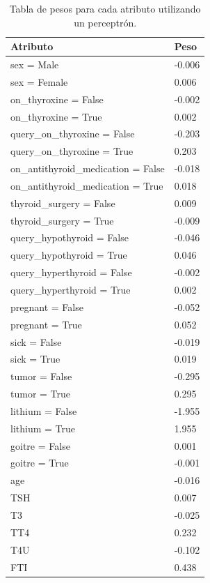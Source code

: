 \documentclass[osajnl,twocolumn,showpacs,superscriptaddress,10pt,floatfix]{revtex4-1} %
\begin{document}
\begin{table}[ht]
    \begin{tabular}{l|l}
        Atributo & Peso \\
        \hline
        sex = Male & -0.006 \\
        sex = Female & 0.006 \\
        on\_thyroxine = False & -0.002 \\
        on\_thyroxine = True & 0.002 \\
        query\_on\_thyroxine = False & -0.203 \\
        query\_on\_thyroxine = True & 0.203 \\
        on\_antithyroid\_medication = False & -0.018 \\
        on\_antithyroid\_medication = True & 0.018 \\
        thyroid\_surgery = False & 0.009 \\
        thyroid\_surgery = True & -0.009 \\
        query\_hypothyroid = False & -0.046 \\
        query\_hypothyroid = True & 0.046 \\
        query\_hyperthyroid = False & -0.002 \\
        query\_hyperthyroid = True & 0.002 \\
        pregnant = False & -0.052 \\
        pregnant = True & 0.052 \\
        sick = False & -0.019 \\
        sick = True & 0.019 \\
        tumor = False & -0.295 \\
        tumor = True & 0.295 \\
        lithium = False & -1.955 \\
        lithium = True & 1.955 \\
        goitre = False & 0.001 \\
        goitre = True & -0.001 \\
        age & -0.016 \\
        TSH & 0.007 \\
        T3 & -0.025 \\
        TT4 & 0.232 \\
        T4U & -0.102 \\
        FTI & 0.438 \\
    \end{tabular}
    \caption{Tabla de pesos para cada atributo utilizando un perceptrón.}
    \label{table:perceptron_attr_weight}
\end{table}
\end{document}
